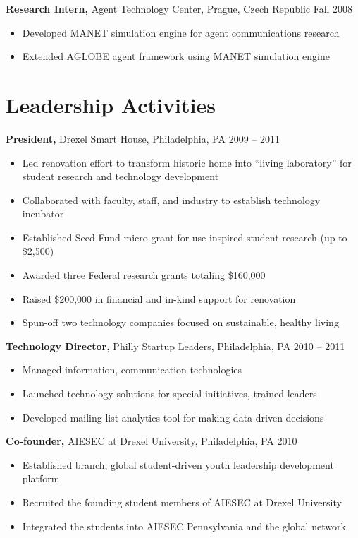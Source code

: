 \documentclass[margin]{res}
\begin{document}
\begin{resume}
{\bf Research Intern,} Agent Technology Center, Prague, Czech Republic \hfill  Fall 2008
\begin{itemize} \itemsep -2pt %
\item Developed MANET simulation engine for agent communications research
\item Extended AGLOBE agent framework using MANET simulation engine 
\end{itemize}

\section{Leadership  Activities} 
     {\bf President,} Drexel Smart House, Philadelphia, PA \hfill 2009 -- 2011 
     \begin{itemize} \itemsep -2pt
     \item Led renovation effort to transform historic home into ``living laboratory'' for student research and technology development 
     \item Collaborated with faculty, staff, and industry to establish technology incubator
     \item Established Seed Fund micro-grant for use-inspired student research (up to \$2,500)   
     \item Awarded three Federal research grants totaling \$160,000
     \item Raised \$200,000 in financial and in-kind support for renovation
	\item Spun-off two technology companies focused on sustainable, healthy living
	\end{itemize}

	{\bf  Technology Director,}  Philly Startup Leaders, Philadelphia, PA \hfill 2010 -- 2011 
	\begin{itemize} \itemsep -2pt
	\item Managed information, communication technologies 
	\item Launched technology solutions for special initiatives, trained leaders 
	\item Developed mailing list analytics tool for making data-driven decisions 
	\end{itemize}

     {\bf Co-founder,} AIESEC at Drexel University, Philadelphia, PA \hfill 2010 
     \begin{itemize} \itemsep -2pt
     \item Established branch, global student-driven youth leadership development platform
     \item Recruited the founding student members of AIESEC at Drexel University
	\item Integrated the students into AIESEC Pennsylvania and the global network
	\end{itemize}


\end{resume}
\end{document}
